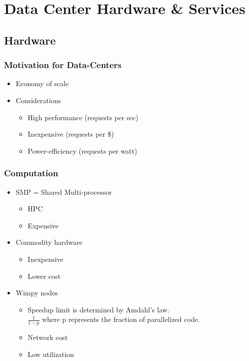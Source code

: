 \documentclass[a4paper]{article}
\begin{document}
\newpage

\section{Data Center Hardware \& Services}

\subsection{Hardware}

\subsubsection{Motivation for Data-Centers}

\begin{itemize}
\item
    Economy of scale
\item
    Considerations
    \begin{itemize}
        \item
        High performance (requests per sec)
    \item
        Inexpensive (requests per \$)
    \item
        Power-efficiency (requests per watt)
    \end{itemize}
\end{itemize}

\subsubsection{Computation}

\begin{itemize}
\item
    SMP = Shared Multi-processor
    \begin{itemize}
        \item
        HPC
    \item
        Expensive
    \end{itemize}
\item
    Commodity hardware
    \begin{itemize}
        \item
        Inexpensive
    \item
        Lower cost
    \end{itemize}
\item
    Wimpy nodes

    \begin{itemize}
        \item
        Speedup limit is determined by Amdahl's law. \\$\frac{1}{1 - p}$ where p represents the fraction of parallelized code.
    \item
        Network cost
    \item
        Low utilization
    \end{itemize}
\end{itemize}
\end{document}
